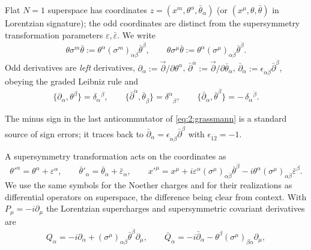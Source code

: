 Flat $N=1$ superspace has coordinates
$z=(x^m,\theta^\alpha,\bar\theta_{\dot\alpha})$ (or $(x^\mu,\theta,\bar\theta)$
in Lorentzian signature); the odd coordinates are distinct from the
supersymmetry transformation parameters $\varepsilon,\bar\varepsilon$. We
write
\begin{equation}
\theta\sigma^m\bar\theta
:=\theta^\alpha(\sigma^m)_{\alpha\dot\beta}\bar\theta^{\dot\beta},\qquad
\theta\sigma^\mu\bar\theta
:=\theta^\alpha(\sigma^\mu)_{\alpha\dot\beta}\bar\theta^{\dot\beta} .
\label{eq:2:thetasigmabar}
\end{equation}
Odd derivatives are \emph{left} derivatives,
$\partial_\alpha:=\vec\partial/\partial\theta^\alpha$,
$\bar\partial^{\dot\alpha}:=\vec\partial/\partial\bar\theta_{\dot\alpha}$,
$\bar\partial_{\dot\alpha}
:=\epsilon_{\dot\alpha\dot\beta}\bar\partial^{\dot\beta}$, obeying the graded
Leibniz rule and
\begin{equation}
\{\partial_\alpha,\theta^\beta\}=\delta_\alpha{}^\beta,\qquad
\{\bar\partial^{\dot\alpha},\bar\theta_{\dot\beta}\}
=\delta^{\dot\alpha}{}_{\dot\beta},\qquad
\{\bar\partial_{\dot\alpha},\bar\theta^{\dot\beta}\}
=-\,\delta_{\dot\alpha}{}^{\dot\beta}.
\label{eq:2:grassmann}
\end{equation}
\begin{remark}\label{rem:2:barsign}
The minus sign in the last anticommutator of \eqref{eq:2:grassmann} is a
standard source of sign errors; it traces back to
$\bar\partial_{\dot\alpha}=\epsilon_{\dot\alpha\dot\beta}\bar\partial^{\dot\beta}$
with $\epsilon_{\dot1\dot2}=-1$.
\end{remark}
A supersymmetry transformation acts on the coordinates as
\begin{equation}
\theta'^\alpha=\theta^\alpha+\varepsilon^\alpha,\qquad
\bar\theta'_{\dot\alpha}=\bar\theta_{\dot\alpha}+\bar\varepsilon_{\dot\alpha},
\qquad
x'^\mu=x^\mu
+i\varepsilon^\alpha(\sigma^\mu)_{\alpha\dot\beta}\bar\theta^{\dot\beta}
-i\theta^\alpha(\sigma^\mu)_{\alpha\dot\beta}\bar\varepsilon^{\dot\beta} .
\label{eq:2:susytransf}
\end{equation}
We use the same symbols for the Noether charges and for their realizations as
differential operators on superspace, the difference being clear from context.
With $P_\mu=-i\partial_\mu$ the Lorentzian supercharges and supersymmetric
covariant derivatives are
\begin{equation}
Q_\alpha=-i\partial_\alpha
+(\sigma^\mu)_{\alpha\dot\beta}\bar\theta^{\dot\beta}\partial_\mu,\qquad
\bar Q_{\dot\alpha}=-i\bar\partial_{\dot\alpha}
-\theta^\beta(\sigma^\mu)_{\beta\dot\alpha}\partial_\mu ,
\label{eq:2:QL}
\end{equation}
